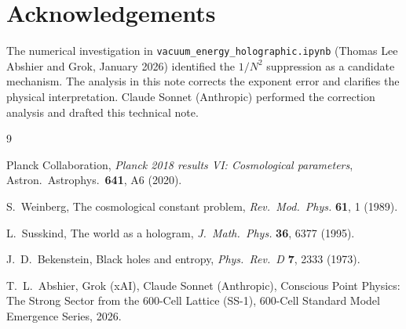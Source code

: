 \documentclass[11pt]{article}
\begin{document}
\section*{Acknowledgements}

The numerical investigation in \texttt{vacuum\_energy\_holographic.ipynb}
(Thomas Lee Abshier and Grok, January 2026) identified the $1/N^2$
suppression as a candidate mechanism.  The analysis in this note
corrects the exponent error and clarifies the physical interpretation.
Claude Sonnet (Anthropic) performed the correction analysis and drafted
this technical note.

\begin{thebibliography}{9}

Planck Collaboration,
\textit{Planck 2018 results VI: Cosmological parameters},
Astron.\ Astrophys.\ \textbf{641}, A6 (2020).

S.~Weinberg,
The cosmological constant problem,
\textit{Rev.\ Mod.\ Phys.} \textbf{61}, 1 (1989).

L.~Susskind,
The world as a hologram,
\textit{J.\ Math.\ Phys.} \textbf{36}, 6377 (1995).

J.~D.~Bekenstein,
Black holes and entropy,
\textit{Phys.\ Rev.\ D} \textbf{7}, 2333 (1973).

T.~L.~Abshier, Grok (xAI), Claude Sonnet (Anthropic),
Conscious Point Physics: The Strong Sector from the 600-Cell Lattice
(SS-1), 600-Cell Standard Model Emergence Series, 2026.

\end{thebibliography}
\end{document}
